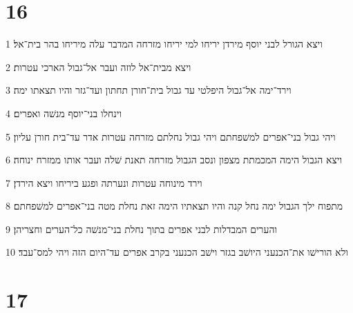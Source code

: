 \chapter{16}

\par 1 ויצא הגורל לבני יוסף מירדן יריחו למי יריחו מזרחה המדבר עלה מיריחו בהר בית־אל׃
\par 2 ויצא מבית־אל לוזה ועבר אל־גבול הארכי עטרות׃
\par 3 וירד־ימה אל־גבול היפלטי עד גבול בית־חורן תחתון ועד־גזר והיו תצאתו ימה׃
\par 4 וינחלו בני־יוסף מנשׁה ואפרים׃
\par 5 ויהי גבול בני־אפרים למשׁפחתם ויהי גבול נחלתם מזרחה עטרות אדר עד־בית חורן עליון׃
\par 6 ויצא הגבול הימה המכמתת מצפון ונסב הגבול מזרחה תאנת שׁלה ועבר אותו ממזרח ינוחה׃
\par 7 וירד מינוחה עטרות ונערתה ופגע ביריחו ויצא הירדן׃
\par 8 מתפוח ילך הגבול ימה נחל קנה והיו תצאתיו הימה זאת נחלת מטה בני־אפרים למשׁפחתם׃
\par 9 והערים המבדלות לבני אפרים בתוך נחלת בני־מנשׁה כל־הערים וחצריהן׃
\par 10 ולא הורישׁו את־הכנעני היושׁב בגזר וישׁב הכנעני בקרב אפרים עד־היום הזה ויהי למס־עבד׃

\chapter{17}

